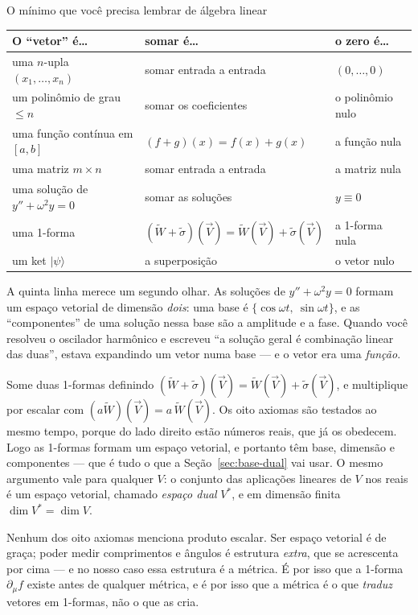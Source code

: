 \documentclass[12pt,a4paper,oneside]{book}
\theoremstyle{rgplain}
\theoremstyle{rgremark}
\newcommand{\ket}[1]{\lvert #1 \rangle}
\begin{document}
\begin{interludio}{O mínimo que você precisa lembrar de álgebra linear}
\begin{center}
\small
\begin{tabular}{@{}lll@{}}
\toprule
O ``vetor'' é\dots & somar é\dots & o zero é\dots \\
\midrule
uma $n$-upla $(x_1,\dots,x_n)$ & somar entrada a entrada & $(0,\dots,0)$ \\
um polinômio de grau $\le n$ & somar os coeficientes & o polinômio nulo \\
uma função contínua em $[a,b]$ & $(f+g)(x)=f(x)+g(x)$ & a função nula \\
uma matriz $m\times n$ & somar entrada a entrada & a matriz nula \\
uma solução de $y''+\omega^2y=0$ & somar as soluções & $y\equiv0$ \\
uma 1-forma & $(\tilde W+\tilde\sigma)(\vec V)=\tilde W(\vec V)+\tilde\sigma(\vec V)$ & a 1-forma nula \\
um ket $\ket{\psi}$ & a superposição & o vetor nulo \\
\bottomrule
\end{tabular}
\end{center}

A quinta linha merece um segundo olhar. As soluções de $y''+\omega^2y=0$
formam um espaço vetorial de dimensão \emph{dois}: uma base é
$\{\cos\omega t,\ \sin\omega t\}$, e as ``componentes'' de uma solução nessa
base são a amplitude e a fase. Quando você resolveu o oscilador harmônico e
escreveu ``a solução geral é combinação linear das duas'', estava expandindo um
vetor numa base --- e o vetor era uma \emph{função}.

Some duas
1-formas definindo
$(\tilde W+\tilde\sigma)(\vec V)=\tilde W(\vec V)+\tilde\sigma(\vec V)$,
e multiplique por escalar com $(a\tilde W)(\vec V)=a\,\tilde W(\vec V)$. Os oito axiomas são testados ao mesmo tempo, porque
do lado direito estão números reais, que já os obedecem. Logo as 1-formas
formam um espaço vetorial, e portanto têm base, dimensão e componentes --- que
é tudo o que a Seção~\ref{sec:base-dual} vai usar. O mesmo argumento vale para
qualquer $V$: o conjunto das aplicações lineares de $V$ nos reais é um espaço
vetorial, chamado \emph{espaço dual} $V^*$, e em dimensão finita
$\dim V^*=\dim V$.

\begin{atencao}[title={\sffamily\bfseries\footnotesize\color{rgTerracota}O QUE OS AXIOMAS NÃO DÃO}]
Nenhum dos oito axiomas menciona produto escalar. Ser espaço vetorial é de
graça; poder medir comprimentos e ângulos é estrutura \emph{extra}, que se
acrescenta por cima --- e no nosso caso essa estrutura é a métrica. É por isso
que a 1-forma $\partial_\mu f$ existe antes de qualquer métrica, e é por isso
que a métrica é o que \emph{traduz} vetores em 1-formas, não o que as cria.
\end{atencao}


\end{interludio}
\end{document}
